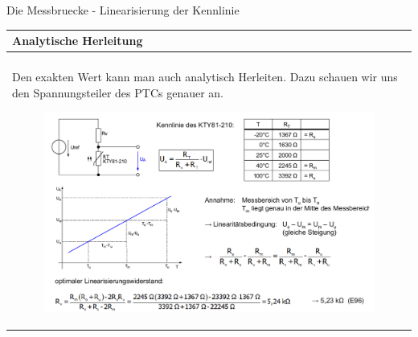 \begin{frame}[t]{Die Messbruecke - Linearisierung der Kennlinie}

    \begin{spacing}{0.9} \begin{tiny}
            \begin{table}[h!]
                \begin{tabular}{p{10cm} }
                    \hline
                    \textbf{Analytische Herleitung} \\
                    \hline                          \\
                    \begin{minipage}{\textwidth}
                        Den exakten Wert kann man auch analytisch Herleiten. Dazu schauen wir uns den Spannungsteiler des PTCs genauer an.
                    \end{minipage}
                    \begin{minipage}{\textwidth}
                        \begin{figure}
                            \centering
                            \includegraphics[width=0.9\linewidth]{pictures/linearisierung.png}
                        \end{figure}
                    \end{minipage}
                    \\
                \end{tabular}

            \end{table}

        \end{tiny} \end{spacing}

\end{frame}
